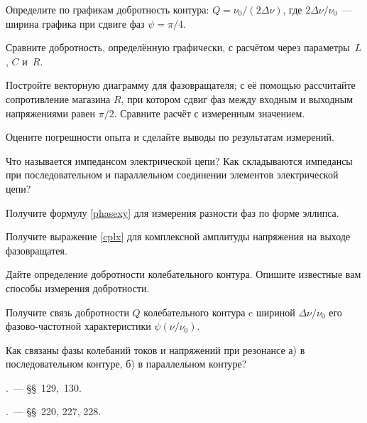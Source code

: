 \begin{lab:task}
Определите по графикам добротность контура: $Q=\nu_0/(2\Delta\nu)$, 
где $2\Delta\nu/\nu_0$~--- ширина графика при сдвиге фаз $\psi=\pi/4$.

\item Сравните добротность, определённую графически, с расчётом 
через параметры~$L$, $C$ и~$R$.

\item Постройте векторную диаграмму для фазовращателя; 
с её помощью рассчитайте сопротивление магазина $R$, при котором 
сдвиг фаз между входным и выходным напряжениями равен $\pi/2$. 
Сравните расчёт с измеренным значением.


\item Оцените погрешности опыта и сделайте выводы по результатам измерений.

\end{lab:task}


\begin{lab:questions}
	\item Что называется импедансом электрической цепи?
	Как складываются импедансы при последовательном и параллельном
соединении элементов электрической цепи?
    \item Получите формулу \eqref{phasexy} для измерения разности 
          фаз по форме эллипса.
    \item Получите выражение \eqref{cplx} для комплексной амплитуды напряжения на
    выходе фазовращатея.
    \item Дайте определение добротности колебательного контура.
    Опишите известные вам способы измерения добротности.
    \item Получите связь добротности $Q$ колебательного контура c шириной
    $\Delta \nu/\nu_0$ его фазово-частотной характеристики $\psi(\nu/\nu_0)$.
    \item Как связаны фазы колебаний токов и напряжений 
    при резонансе а) в последовательном контуре, б) в параллельном контуре?
\end{lab:questions}


\begin{lab:literature}
	\item \SivuhinIII.~--- \S\S~129,~130.
	\item \Kalashnikov.~--- \S\S~220, 227, 228.
\end{lab:literature}

